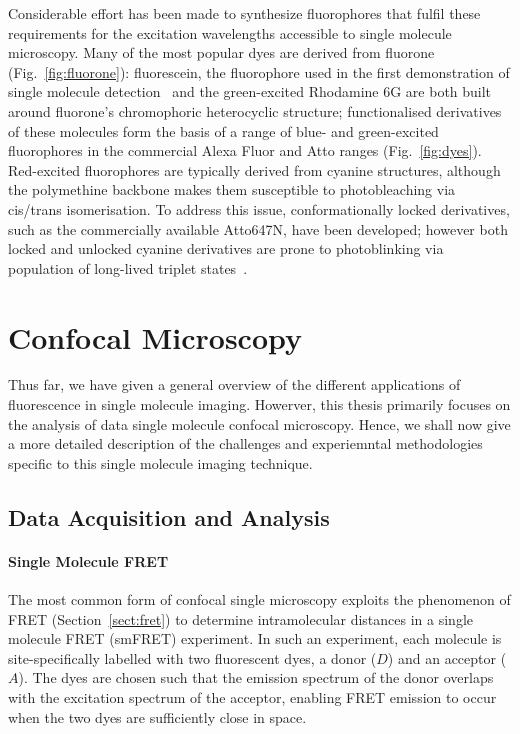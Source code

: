 Considerable effort has been made to synthesize fluorophores that fulfil these requirements for the excitation wavelengths accessible to single molecule microscopy. Many of the most popular dyes are derived from fluorone (Fig.~\ref{fig:fluorone}): fluorescein, the fluorophore used in the first demonstration of single molecule detection~\cite{???} and the green-excited Rhodamine 6G are both built around fluorone's chromophoric heterocyclic structure; functionalised derivatives of these molecules form the basis of a range of blue- and green-excited fluorophores in the commercial Alexa Fluor and Atto ranges (Fig.~\ref{fig:dyes}). Red-excited fluorophores are typically derived from cyanine structures, although the polymethine backbone makes them susceptible to photobleaching via cis/trans isomerisation. To address this issue, conformationally locked derivatives, such as the commercially available Atto647N, have been developed; however both locked and unlocked cyanine derivatives are prone to photoblinking via population of long-lived triplet states~\cite{???}.

\section{Confocal Microscopy}
Thus far, we have given a general overview of the different applications of fluorescence in single molecule imaging. Howerver, this thesis primarily focuses on the analysis of data single molecule confocal microscopy. Hence, we shall now give a more detailed description of the challenges and experiemntal methodologies specific to this single molecule imaging technique.

\subsection{Data Acquisition and Analysis}
\paragraph{Single Molecule FRET}
The most common form of confocal single microscopy exploits the phenomenon of FRET (Section~\ref{sect:fret}) to determine intramolecular distances in a single molecule FRET (smFRET) experiment. In such an experiment, each molecule is site-specifically labelled with two fluorescent dyes, a donor ($D$) and an acceptor ($A$). The dyes are chosen such that the emission spectrum of the donor overlaps with the excitation spectrum of the acceptor, enabling FRET emission to occur when the two dyes are sufficiently close in space. 

